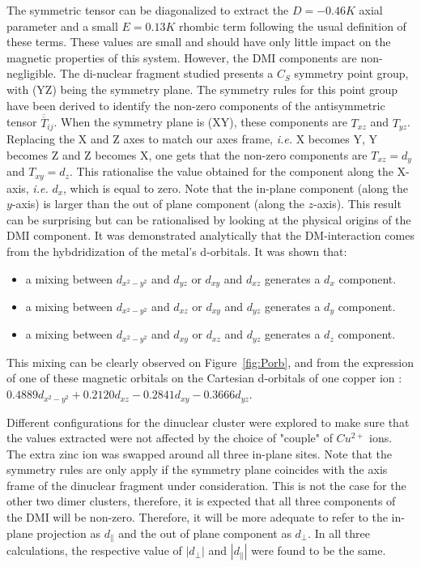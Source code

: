 \documentclass[12pt]{report}
\numberwithin{equation}{section}
\begin{document}
The symmetric tensor can be diagonalized to extract the $ D = - 0.46 K $ axial parameter and a small $ E = 0.13 K$ rhombic term following the usual definition of these terms.
These values are small and should have only little impact on the magnetic properties of this system.
However, the DMI components are non-negligible. 
The di-nuclear fragment studied presents a $C_S$ symmetry point group, with (YZ) being the symmetry plane. 
The symmetry rules for this point group have been derived to identify the non-zero components of the antisymmetric tensor $\overline{\overline{T}}_{ij}$.
When the symmetry plane is (XY), these components are $T_{xz}$ and $T_{yz}$.
Replacing the X and Z axes to match our axes frame, \textit{i.e.} X becomes Y, Y becomes Z and Z becomes X, one gets that the non-zero components are $T_{xz}=d_y$ and $T_{xy}=d_z$.
This rationalise the value obtained for the component along the X-axis, \textit{i.e.} $d_x$, which is equal to zero.
Note that the in-plane component (along the $y$-axis) is larger than the out of plane component (along the $z$-axis). 
This result can be surprising but can be rationalised by looking at the physical origins of the DMI component.
It was demonstrated analytically that the DM-interaction comes from the hybdridization of the metal's d-orbitals. 
It was shown that:
\begin{itemize}
    \item a mixing between $ d_{x^2-y^2}$ and $ d_{yz}$ or $ d_{xy}$ and $d_{xz}$ generates a $ d_{x}$ component.
    \item a mixing between $d_{x^2-y^2}$ and $ d_{xz}$ or $ d_{xy}$ and $d_{yz}$ generates a $ d_{y}$ component.
    \item a mixing between $ d_{x^2-y^2}$ and $d_{xy}$ or $ d_{xz}$ and $d_{yz}$ generates a $ d_{z}$ component.
\end{itemize}

This mixing can be clearly observed on Figure~\ref{fig:Porb}, and from the expression of one of these magnetic orbitals on the Cartesian
d-orbitals of one copper ion : $0.4889d_{x^2-y^2}+0.2120d_{xz}-0.2841d_{xy}-0.3666d_{yz}$. 




Different configurations for the dinuclear cluster were explored to make sure that the values extracted were not affected by the choice of "couple" of $Cu^{2+}$ ions. 
The extra zinc ion was swapped around all three in-plane sites. 
Note that the symmetry rules are only apply if the symmetry plane coincides with the axis frame of the dinuclear fragment under consideration.
This is not the case for the other two dimer clusters, therefore, it is expected that all three components of the DMI will be non-zero.
Therefore, it will be more adequate to refer to the in-plane projection as $d_{\parallel}$ and the out of plane component as $d_{\perp}$.
In all three calculations, the respective value of $|d_{\perp}|$ and $|d_{\parallel}|$ were found to be the same.
\end{document}
